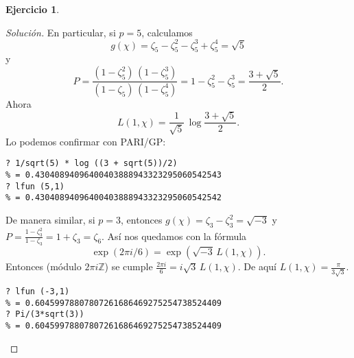\documentclass{article}
\newcounter{tarea}
\theoremstyle{definition}
\newtheorem{ejercicio}{Ejercicio}[tarea]
\newenvironment{solucion}{\begin{proof}[Solución]}{\end{proof}}
\newcommand{\ZZ}{\mathbb{Z}}
\begin{document}
\begin{ejercicio}
\begin{solucion}
    En particular, si $p = 5$, calculamos
    $$g (\chi) = \zeta_5 - \zeta_5^2 - \zeta_5^3 + \zeta_5^4 = \sqrt{5}$$
    y
    \[ P = \frac{(1 - \zeta_5^2)\,(1 - \zeta_5^3)}{(1 - \zeta_5)\,(1 - \zeta_5^4)}
         = 1 - \zeta_5^2 - \zeta_5^3 = \frac{3+\sqrt{5}}{2}. \]
    Ahora
    $$L (1,\chi) = \frac{1}{\sqrt{5}}\,\log \frac{3+\sqrt{5}}{2}.$$
    Lo podemos confirmar con PARI/GP:
    \begin{framed}
\begin{verbatim}
? 1/sqrt(5) * log ((3 + sqrt(5))/2)
% = 0.43040894096400403888943323295060542543
? lfun (5,1)
% = 0.43040894096400403888943323295060542542
\end{verbatim}
    \end{framed}
    De manera similar, si $p = 3$, entonces $g (\chi) = \zeta_3 - \zeta_3^2 = \sqrt{-3}$
    y $P = \frac{1 - \zeta_3^2}{1 - \zeta_3} = 1 + \zeta_3 = \zeta_6$.
    Así nos quedamos con la fórmula
    $$\exp (2\pi i/6) = \exp (\sqrt{-3} \, L (1,\chi)).$$
    Entonces (módulo $2\pi i\ZZ$) se cumple
    $\frac{2\pi i}{6} = i\sqrt{3} \, L (1,\chi)$.
    De aquí $L (1,\chi) = \frac{\pi}{3\sqrt{3}}$.
    \begin{framed}
\begin{verbatim}
? lfun (-3,1)
% = 0.60459978807807261686469275254738524409
? Pi/(3*sqrt(3))
% = 0.60459978807807261686469275254738524409
\end{verbatim}
    \end{framed}
  \end{solucion}
  \fi
\end{ejercicio}
\end{document}
